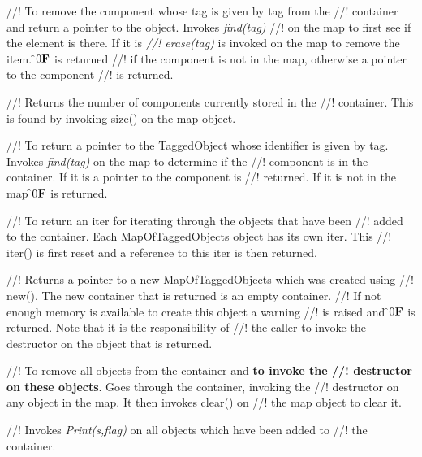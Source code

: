 //! To remove the component whose tag is given by \p tag from the
//! container and return a pointer to the object. Invokes {\em find(tag)}
//! on the map to first see if the element is there. If it is {\em
//! erase(tag)} is invoked on the map to remove the item. \f$0{\bf F}$ is returned
//! if the component is not in the map, otherwise a pointer to the component
//! is returned.

//! Returns the number of components currently stored in the
//! container. This is found by invoking size() on the map object.

//! To return a pointer to the TaggedObject whose identifier is given by
\p tag. Invokes {\em find(tag)} on the map to determine if the
//! component is in the container. If it is a pointer to the component is
//! returned. If it is not in the map \f$0{\bf F}$ is returned.

//! To return an iter for iterating through the objects that have been
//! added to the container. Each MapOfTaggedObjects object has its own iter. This
//! iter() is first reset and a reference to this iter is then returned. 

//! Returns a pointer to a new MapOfTaggedObjects which was created using
//! new(). The new container that is returned is an empty container.
//! If not enough memory is available to create this object a warning
//! is raised and \f$0{\bf F}$ is returned. Note that it is the responsibility of
//! the caller to invoke the destructor on the object that is returned.


//! To remove all objects from the container and {\bf to invoke the
//! destructor on these objects}. Goes through the container, invoking the
//! destructor on any object in the map. It then invokes clear() on
//! the map object to clear it.

//! Invokes {\em Print(s,flag)} on all objects which have been added to
//! the container. 






